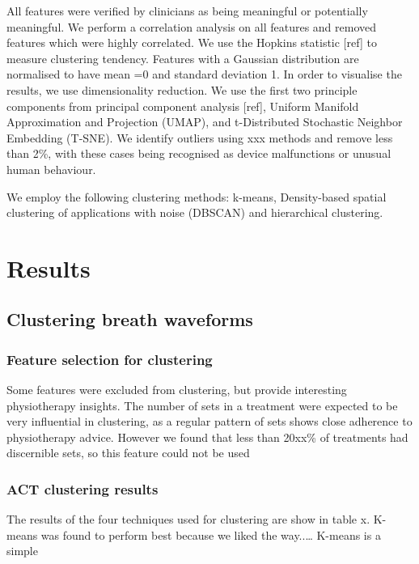 \documentclass{article}
\begin{document}
All features were verified by clinicians as being meaningful or potentially meaningful. We perform a correlation analysis on all features and removed features which were highly correlated. We use the Hopkins statistic [ref] to measure clustering tendency. Features with a Gaussian distribution are normalised to have mean =0 and standard deviation 1. In order to visualise the results, we use dimensionality reduction. We use the first two principle components from principal component analysis [ref], Uniform Manifold Approximation and Projection (UMAP), and t-Distributed Stochastic Neighbor Embedding (T-SNE). We identify outliers using xxx methods and remove less than 2\%, with these cases being recognised as device malfunctions or unusual human behaviour.  

We employ the following clustering methods: k-means, Density-based spatial clustering of applications with noise (DBSCAN) and hierarchical clustering.  

\section{Results}
\subsection{Clustering breath waveforms}
\subsubsection{Feature selection for clustering}
Some features were excluded from clustering, but provide interesting physiotherapy insights.  
The number of sets in a treatment were expected to be very influential in clustering, as a regular pattern of sets shows close adherence to physiotherapy advice. However we found that less than 20xx\% of treatments had discernible sets, so this feature could not be used


\subsubsection{ACT clustering results}
The results of the four techniques used for clustering are show in table x. K-means was found to perform best because we liked the way..… K-means is a simple 
\end{document}
